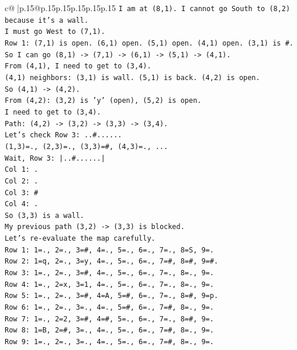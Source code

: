 \documentclass{article}
\begin{document}
{\begin{supertabular}{c@{$\;$}|p{.15\linewidth}@{}p{.15\linewidth}p{.15\linewidth}p{.15\linewidth}p{.15\linewidth}p{.15\linewidth}}
{{{\texttt{I am at (8,1). I cannot go South to (8,2) because it's a wall.} \\
\texttt{I must go West to (7,1).} \\
\texttt{Row 1: (7,1) is open. (6,1) open. (5,1) open. (4,1) open. (3,1) is \#.} \\
\texttt{So I can go (8,1) {-}> (7,1) {-}> (6,1) {-}> (5,1) {-}> (4,1).} \\
\texttt{From (4,1), I need to get to (3,4).} \\
\texttt{(4,1) neighbors: (3,1) is wall. (5,1) is back. (4,2) is open.} \\
\texttt{So (4,1) {-}> (4,2).} \\
\texttt{From (4,2): (3,2) is 'y' (open), (5,2) is open.} \\
\texttt{I need to get to (3,4).} \\
\texttt{Path: (4,2) {-}> (3,2) {-}> (3,3) {-}> (3,4).} \\
\texttt{Let's check Row 3: ..\#......} \\
\texttt{(1,3)=., (2,3)=., (3,3)=\#, (4,3)=., ...} \\
\texttt{Wait, Row 3: |..\#......|} \\
\texttt{Col 1: .} \\
\texttt{Col 2: .} \\
\texttt{Col 3: \#} \\
\texttt{Col 4: .} \\
\texttt{So (3,3) is a wall.} \\
\texttt{My previous path (3,2) {-}> (3,3) is blocked.} \\
\texttt{Let's re{-}evaluate the map carefully.} \\
\texttt{Row 1: 1=., 2=., 3=\#, 4=., 5=., 6=., 7=., 8=S, 9=.} \\
\texttt{Row 2: 1=q, 2=., 3=y, 4=., 5=., 6=., 7=\#, 8=\#, 9=\#.} \\
\texttt{Row 3: 1=., 2=., 3=\#, 4=., 5=., 6=., 7=., 8=., 9=.} \\
\texttt{Row 4: 1=., 2=x, 3=1, 4=., 5=., 6=., 7=., 8=., 9=.} \\
\texttt{Row 5: 1=., 2=., 3=\#, 4=A, 5=\#, 6=., 7=., 8=\#, 9=p.} \\
\texttt{Row 6: 1=., 2=., 3=., 4=., 5=\#, 6=., 7=\#, 8=., 9=.} \\
\texttt{Row 7: 1=., 2=2, 3=\#, 4=\#, 5=., 6=., 7=., 8=\#, 9=.} \\
\texttt{Row 8: 1=B, 2=\#, 3=., 4=., 5=., 6=., 7=\#, 8=., 9=.} \\
\texttt{Row 9: 1=., 2=., 3=., 4=., 5=., 6=., 7=\#, 8=., 9=.} \\
}}}
\end{supertabular}}
\end{document}
